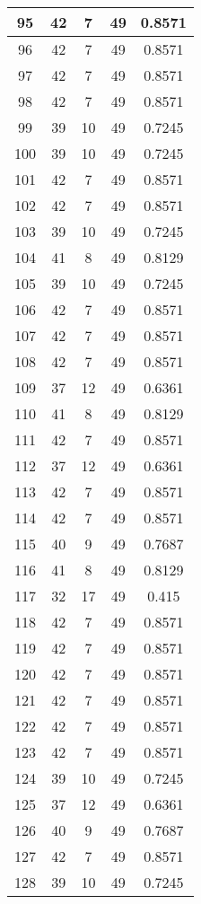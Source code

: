 \documentclass[letterpaper, 12pt]{article}
\begin{document}
\begin{longtable}{|c|c|c|c|c|}
95 & 42 & 7 & 49 & 0.8571 \\
\hline
96 & 42 & 7 & 49 & 0.8571 \\
\hline
97 & 42 & 7 & 49 & 0.8571 \\
\hline
98 & 42 & 7 & 49 & 0.8571 \\
\hline
99 & 39 & 10 & 49 & 0.7245 \\
\hline
100 & 39 & 10 & 49 & 0.7245 \\
\hline
101 & 42 & 7 & 49 & 0.8571 \\
\hline
102 & 42 & 7 & 49 & 0.8571 \\
\hline
103 & 39 & 10 & 49 & 0.7245 \\
\hline
104 & 41 & 8 & 49 & 0.8129 \\
\hline
105 & 39 & 10 & 49 & 0.7245 \\
\hline
106 & 42 & 7 & 49 & 0.8571 \\
\hline
107 & 42 & 7 & 49 & 0.8571 \\
\hline
108 & 42 & 7 & 49 & 0.8571 \\
\hline
109 & 37 & 12 & 49 & 0.6361 \\
\hline
110 & 41 & 8 & 49 & 0.8129 \\
\hline
111 & 42 & 7 & 49 & 0.8571 \\
\hline
112 & 37 & 12 & 49 & 0.6361 \\
\hline
113 & 42 & 7 & 49 & 0.8571 \\
\hline
114 & 42 & 7 & 49 & 0.8571 \\
\hline
115 & 40 & 9 & 49 & 0.7687 \\
\hline
116 & 41 & 8 & 49 & 0.8129 \\
\hline
117 & 32 & 17 & 49 & 0.415 \\
\hline
118 & 42 & 7 & 49 & 0.8571 \\
\hline
119 & 42 & 7 & 49 & 0.8571 \\
\hline
120 & 42 & 7 & 49 & 0.8571 \\
\hline
121 & 42 & 7 & 49 & 0.8571 \\
\hline
122 & 42 & 7 & 49 & 0.8571 \\
\hline
123 & 42 & 7 & 49 & 0.8571 \\
\hline
124 & 39 & 10 & 49 & 0.7245 \\
\hline
125 & 37 & 12 & 49 & 0.6361 \\
\hline
126 & 40 & 9 & 49 & 0.7687 \\
\hline
127 & 42 & 7 & 49 & 0.8571 \\
\hline
128 & 39 & 10 & 49 & 0.7245 \\

\end{longtable}
\end{document}
